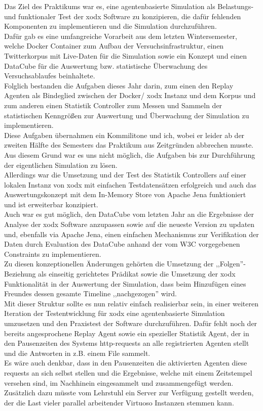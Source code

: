 \documentclass{article}
\begin{document}
Das Ziel des Praktikums war es, eine agentenbasierte Simulation als Belastungs- und funktionaler Test der xodx Software zu konzipieren, die dafür fehlenden Komponenten zu implementieren und die Simulation durchzuführen.\\
Dafür gab es eine umfangreiche Vorarbeit aus dem letzten Wintersemester, welche Docker Container zum Aufbau der Versuchsinfrastruktur, einen Twitterkorpus mit Live-Daten für die Simulation sowie ein Konzept und einen DataCube für die Auswertung bzw. statistische Überwachung des Versuchsablaufes beinhaltete.\\
Folglich bestanden die Aufgaben dieses Jahr darin, zum einen den Replay Agenten als Bindeglied zwischen der Docker/ xodx Instanz und dem Korpus und zum anderen einen Statistik Controller zum Messen und Sammeln der statistischen Kenngrößen zur Auswertung und Überwachung der Simulation zu implementieren.\\
Diese Aufgaben übernahmen ein Kommilitone und ich, wobei er leider ab der zweiten Hälfte des Semesters das Praktikum aus Zeitgründen abbrechen musste. Aus diesem Grund war es uns nicht möglich, die Aufgaben bis zur Durchführung der eigentlichen Simulation zu lösen.\\
Allerdings war die Umsetzung und der Test des Statistik Controllers auf einer lokalen Instanz von xodx mit einfachen Testdatensätzen erfolgreich und auch das Auswertungskonzept mit dem In-Memory Store von Apache Jena funktioniert und ist erweiterbar konzipiert.\\
Auch war es gut möglich, den DataCube vom letzten Jahr an die Ergebnisse der Analyse der xodx Software anzupassen sowie auf die neueste Version zu updaten und, ebenfalls via Apache Jena, einen einfachen Mechanismus zur Verifikation der Daten durch Evaluation des DataCube anhand der vom W3C vorgegebenen Constraints zu implementieren. \\
Zu diesen konzeptionellen Änderungen gehörten die Umsetzung der ,,Folgen''-Beziehung als einseitig gerichtetes Prädikat sowie die Umsetzung der xodx Funktionalität in der Auswertung der Simulation, dass beim Hinzufügen eines Freundes dessen gesamte Timeline ,,nachgezogen'' wird.\\
Mit dieser Struktur sollte es nun relativ einfach realisierbar sein, in einer weiteren Iteration der Testentwicklung für xodx eine agentenbasierte Simulation umzusetzen und den Praxistest der Software durchzuführen. Dafür fehlt noch der bereits angesprochene Replay Agent sowie ein spezieller Statistik Agent, der in den Pausenzeiten des Systems http-requests an alle registrierten Agenten stellt und die Antworten in z.B. einem File sammelt.\\
Es wäre auch denkbar, dass in den Pausenzeiten die aktivierten Agenten diese requests an sich selbst stellen und die Ergebnisse, welche mit einem Zeitstempel versehen sind, im Nachhinein eingesammelt und zusammengefügt werden.\\ 
Zusätzlich dazu müsste vom Lehrstuhl ein Server zur Verfügung gestellt werden, der die Last vieler parallel arbeitender Virtuoso Instanzen stemmen kann.

\newpage


\end{document}
